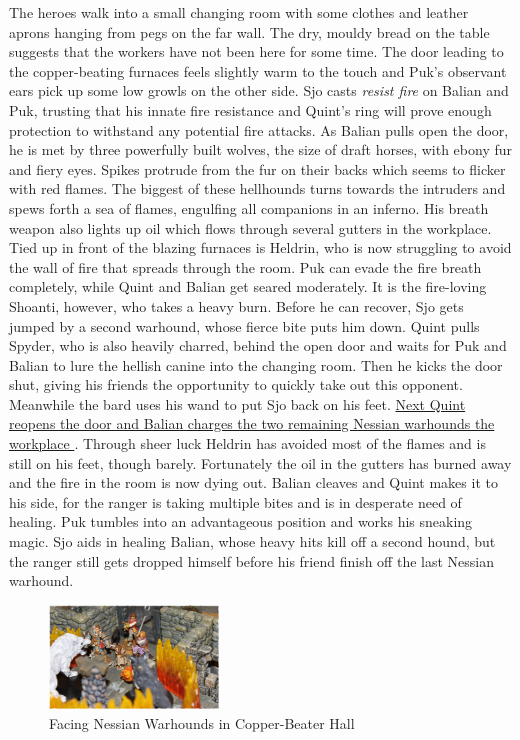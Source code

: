 The heroes walk into a small changing room with some clothes and leather aprons hanging from pegs on the far wall. The dry, mouldy bread on the table suggests that the workers have not been here for some time. The door leading to the copper-beating furnaces feels slightly warm to the touch and Puk's observant ears pick up some low growls on the other side. Sjo casts {\itshape resist fire} on Balian and Puk, trusting that his innate fire resistance and Quint's ring will prove enough protection to withstand any potential fire attacks. As Balian pulls open the door, he is met by three powerfully built wolves, the size of draft horses, with ebony fur and fiery eyes. Spikes protrude from the fur on their backs which seems to flicker with red flames. The biggest of these hellhounds turns towards the intruders and spews forth a sea of flames, engulfing all companions in an inferno. His breath weapon also lights up oil which flows through several gutters in the workplace. Tied up in front of the blazing furnaces is Heldrin, who is now struggling to avoid the wall of fire that spreads through the room. Puk can evade the fire breath completely, while Quint and Balian get seared moderately. It is the fire-loving Shoanti, however, who takes a heavy burn. Before he can recover, Sjo gets jumped by a second warhound, whose fierce bite puts him down. Quint pulls Spyder, who is also heavily charred, behind the open door and waits for Puk and Balian to lure the hellish canine into the changing room. Then he kicks the door shut, giving his friends the opportunity to quickly take out this opponent. Meanwhile the bard uses his wand to put Sjo back on his feet. \hyperref[fig:Facing-Nessian-Warhounds-in-Copper-Beater-Hall-555420948]{ Next Quint reopens the door and Balian charges the two remaining Nessian warhounds the workplace } . Through sheer luck Heldrin has avoided most of the flames and is still on his feet, though barely. Fortunately the oil in the gutters has burned away and the fire in the room is now dying out. Balian cleaves and Quint makes it to his side, for the ranger is taking multiple bites and is in desperate need of healing. Puk tumbles into an advantageous position and works his sneaking magic. Sjo aids in healing Balian, whose heavy hits kill off a second hound, but the ranger still gets dropped himself before his friend finish off the last Nessian warhound. \\

\begin{figure}[h]
	\centering
	\includegraphics[width=0.4\textwidth]{images/Facing-Nessian-Warhounds-in-Copper-Beater-Hall-555420948_mod.jpg}
	\caption{Facing Nessian Warhounds in Copper-Beater Hall}
	\label{fig:Facing-Nessian-Warhounds-in-Copper-Beater-Hall-555420948}
\end{figure}

